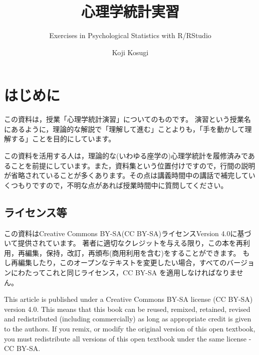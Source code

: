 \documentclass[
  a4paper,
]{ltjsbook}
\title{心理学統計実習}
\subtitle{Exercises in Psychological Statistics with R/RStudio}
\author{Koji Kosugi}
\date{}
\renewcommand*\contentsname{Table of contents}
\newcommand\contentsname{Table of contents}
\begin{document}
\maketitle

\renewcommand*\contentsname{Table of contents}
{
\hypersetup{linkcolor=}
\setcounter{tocdepth}{2}
\tableofcontents
}

\chapter*{はじめに}\label{ux306fux3058ux3081ux306b}


この資料は，授業「心理学統計演習」についてのものです。
演習という授業名にあるように，理論的な解説で「理解して進む」ことよりも，「手を動かして理解する」ことを目的にしています。

この資料を活用する人は，理論的な(いわゆる座学の)心理学統計を履修済みであることを前提にしています。また，資料集という位置付けですので，行間の説明が省略されていることが多くあります。その点は講義時間中の講話で補完していくつもりですので，不明な点があれば授業時間中に質問してください。

\section*{ライセンス等}\label{ux30e9ux30a4ux30bbux30f3ux30b9ux7b49}


この資料はCreative Commons BY-SA(CC BY-SA)ライセンスVersion
4.0に基づいて提供されています。
著者に適切なクレジットを与える限り，この本を再利用，再編集，保持，改訂，再頒布(商用利用を含む)をすることができます。
もし再編集したり，このオープンなテキストを変更したい場合，すべてのバージョンにわたってこれと同じライセンス，CC
BY-SA を適用しなければなりません。

This article is published under a Creative Commons BY-SA license (CC
BY-SA) version 4.0. This means that this book can be reused, remixed,
retained, revised and redistributed (including commercially) as long as
appropriate credit is given to the authors. If you remix, or modify the
original version of this open textbook, you must redistribute all
versions of this open textbook under the same license - CC BY-SA.

\end{document}
